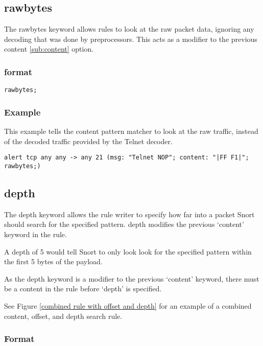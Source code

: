\documentclass[english]{report}
\begin{document}
\subsection{rawbytes \label{sub:rawbytes}}

The rawbytes keyword allows rules to look at the raw packet data, ignoring any
decoding that was done by preprocessors.  This acts as a modifier to the
previous content \ref{sub:content} option. 

\subsubsection{format}

\begin{verbatim}
rawbytes;
\end{verbatim}

\subsubsection{Example}

This example tells the content pattern matcher to look at the raw traffic,
instead of the decoded traffic provided by the Telnet decoder.
\begin{verbatim}
alert tcp any any -> any 21 (msg: "Telnet NOP"; content: "|FF F1|"; rawbytes;)
\end{verbatim}


\subsection{depth\label{sub:depth}}

The depth keyword allows the rule writer to specify how far into a packet Snort
should search for the specified pattern.  depth modifies the previous `content'
keyword in the rule.

A depth of 5 would tell Snort to only look look for the specified pattern
within the first 5 bytes of the payload.

As the depth keyword is a modifier to the previous `content' keyword, there
must be a content in the rule before `depth' is specified.

See Figure \ref{combined rule with offset and depth} for an example of a
combined content, offset, and depth search rule.

\subsubsection{Format}
\end{document}
